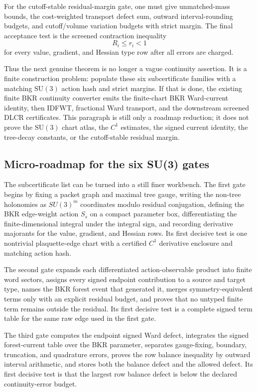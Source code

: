 For the cutoff-stable residual-margin gate, one must give unmatched-mass
bounds, the cost-weighted transport defect sum, outward interval-rounding
budgets, and cutoff/volume variation budgets with strict margin.  The final
acceptance test is the screened contraction inequality
\[
  R_i\le r_i<1
\]
for every value, gradient, and Hessian type row after all errors are charged.

Thus the next genuine theorem is no longer a vague continuity assertion.  It
is a finite construction problem: populate these six subcertificate families
with a matching \(\mathrm{SU}(3)\) action hash and strict margins.  If that is
done, the existing finite BKR continuity converter emits the finite-chart BKR
Ward-current identity, then IDFWT, fractional Ward transport, and the
downstream screened DLCR certificates.  This paragraph is still only a
roadmap reduction; it does not prove the \(\mathrm{SU}(3)\) chart atlas, the
\(C^1\) estimates, the signed current identity, the tree-decay constants, or
the cutoff-stable residual margin.

\subsection{Micro-roadmap for the six SU(3) gates}
The subcertificate list can be turned into a still finer workbench.  The first
gate begins by fixing a packet graph and maximal tree gauge, writing the
non-tree holonomies as \(SU(3)^m\) coordinates modulo residual conjugation,
defining the BKR edge-weight action \(S_s\) on a compact parameter box,
differentiating the finite-dimensional integral under the integral sign, and
recording derivative majorants for the value, gradient, and Hessian rows.  Its
first decisive test is one nontrivial plaquette-edge chart with a certified
\(C^1\) derivative enclosure and matching action hash.

The second gate expands each differentiated action-observable product into
finite word sectors, assigns every signed endpoint contribution to a source
and target type, names the BKR forest event that generated it, merges
symmetry-equivalent terms only with an explicit residual budget, and proves
that no untyped finite term remains outside the residual.  Its first decisive
test is a complete signed term table for the same raw edge used in the first
gate.

The third gate computes the endpoint signed Ward defect, integrates the signed
forest-current table over the BKR parameter, separates gauge-fixing, boundary,
truncation, and quadrature errors, proves the row balance inequality by
outward interval arithmetic, and stores both the balance defect and the
allowed defect.  Its first decisive test is that the largest row balance
defect is below the declared continuity-error budget.

